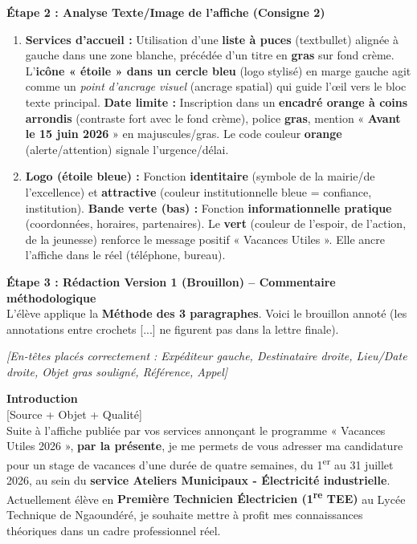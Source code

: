 \documentclass[11pt]{article}
\begin{document}
\begin{exoresolu}
\textbf{Étape 2 : Analyse Texte/Image de l'affiche (Consigne 2)} \\
\begin{enumerate}
    \item \textbf{Services d'accueil :} Utilisation d'une \textbf{liste à puces} (textbullet) alignée à gauche dans une zone blanche, précédée d'un titre en \textbf{gras} sur fond crème. L'\textbf{icône « étoile » dans un cercle bleu} (logo stylisé) en marge gauche agit comme un \emph{point d'ancrage visuel} (ancrage spatial) qui guide l'œil vers le bloc texte principal. \textbf{Date limite :} Inscription dans un \textbf{encadré orange à coins arrondis} (contraste fort avec le fond crème), police \textbf{gras}, mention « \textbf{Avant le 15 juin 2026} » en majuscules/gras. Le code couleur \textbf{orange} (alerte/attention) signale l'urgence/délai.
    \item \textbf{Logo (étoile bleue) :} Fonction \textbf{identitaire} (symbole de la mairie/de l'excellence) et \textbf{attractive} (couleur institutionnelle bleue = confiance, institution). \textbf{Bande verte (bas) :} Fonction \textbf{informationnelle pratique} (coordonnées, horaires, partenaires). Le \textbf{vert} (couleur de l'espoir, de l'action, de la jeunesse) renforce le message positif « Vacances Utiles ». Elle ancre l'affiche dans le réel (téléphone, bureau).
\end{enumerate}

\textbf{Étape 3 : Rédaction Version 1 (Brouillon) -- Commentaire méthodologique} \\
\noindent L'élève applique la \textbf{Méthode des 3 paragraphes}. Voici le brouillon annoté (les annotations entre crochets \textcolor{popblue}{[...]} ne figurent pas dans la lettre finale).

\medskip
\noindent \textcolor{popmuted}{\textit{[En-têtes placés correctement : Expéditeur gauche, Destinataire droite, Lieu/Date droite, Objet gras souligné, Référence, Appel]}}

\medskip
\noindent \textbf{Introduction} \\
\textcolor{popmuted}{[Source + Objet + Qualité]} \\
Suite à l'affiche publiée par vos services annonçant le programme « Vacances Utiles 2026 », \textbf{par la présente}, je me permets de vous adresser ma candidature pour un stage de vacances d'une durée de quatre semaines, du 1\textsuperscript{er} au 31 juillet 2026, au sein du \textbf{service Ateliers Municipaux - Électricité industrielle}. Actuellement élève en \textbf{Première Technicien Électricien (1\textsuperscript{re} TEE)} au Lycée Technique de Ngaoundéré, je souhaite mettre à profit mes connaissances théoriques dans un cadre professionnel réel.


\end{exoresolu}
\end{document}
